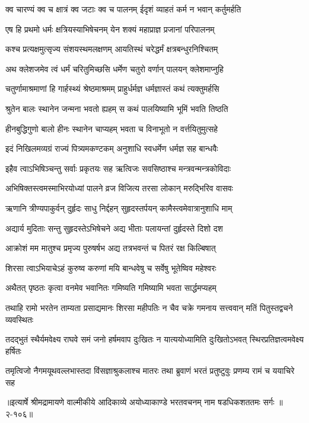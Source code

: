 \twolineshloka
{क्व चारण्यं क्व च क्षात्रं क्व जटाः क्व च पालनम्}
{ईदृशं व्याहतं कर्म न भवान् कर्तुमर्हति} %

\twolineshloka
{एष हि प्रथमो धर्मः क्षत्रियस्याभिषेचनम्}
{येन शक्यं महाप्राज्ञ प्रजानां परिपालनम्} %

\twolineshloka
{कश्च प्रत्यक्षमुत्सृज्य संशयस्थमलक्षणम्}
{आयतिस्थं चरेद्धर्मं क्षत्रबन्धुरनिश्चितम्} %

\twolineshloka
{अथ क्लेशजमेव त्वं धर्मं चरितुमिच्छसि}
{धर्मेण चतुरो वर्णान् पालयन् क्लेशमाप्नुहि} %

\twolineshloka
{चतुर्णामाश्रमाणां हि गार्हस्थ्यं श्रेष्ठमाश्रमम्}
{प्राहुर्धर्मज्ञ धर्मज्ञास्तं कथं त्यक्तुमर्हसि} %

\twolineshloka
{श्रुतेन बालः स्थानेन जन्मना भवतो ह्यहम्}
{स कथं पालयिष्यामि भूमिं भवति तिष्ठति} %

\twolineshloka
{हीनबुद्धिगुणो बालो हीनः स्थानेन चाप्यहम्}
{भवता च विनाभूतो न वर्त्तयितुमुत्सहे} %

\twolineshloka
{इदं निखिलमव्यग्रं राज्यं पित्र्यमकण्टकम्}
{अनुशाधि स्वधर्मेण धर्मज्ञ सह बान्धवैः} %

\twolineshloka
{इहैव त्वाऽभिषिञ्चन्तु सर्वाः प्रकृतयः सह}
{ऋत्विजः सवसिष्ठाश्च मन्त्रवन्मन्त्रकोविदाः} %

\twolineshloka
{अभिषिक्तस्त्वमस्माभिरयोध्यां पालने व्रज}
{विजित्य तरसा लोकान् मरुद्भिरिव वासवः} %

\twolineshloka
{ऋणानि त्रीण्यपाकुर्वन् दुर्हृदः साधु निर्द्दहन्}
{सुहृदस्तर्पयन् कामैस्त्वमेवात्रानुशाधि माम्} %

\twolineshloka
{अद्यार्य मुदिताः सन्तु सुहृदस्तेऽभिषेचने}
{अद्य भीताः पलायन्तां दुर्हृदस्ते दिशो दश} %

\twolineshloka
{आक्रोशं मम मातुश्च प्रमृज्य पुरुषर्षभ}
{अद्य तत्रभवन्तं च पितरं रक्ष किल्बिषात्} %

\twolineshloka
{शिरसा त्वाऽभियाचेऽहं कुरुष्व करुणां मयि}
{बान्धवेषु च सर्वेषु भूतेष्विव महेश्वरः} %

\twolineshloka
{अथैतत् पृष्ठतः कृत्वा वनमेव भवानितः}
{गमिष्यति गमिष्यामि भवता सार्द्धमप्यहम्} %

\twolineshloka
{तथाहि रामो भरतेन ताम्यता प्रसाद्यमानः शिरसा महीपतिः}
{न चैव चक्रे गमनाय सत्त्ववान् मतिं पितुस्तद्वचने व्यवस्थितः} %

\twolineshloka
{तदद्भुतं स्थैर्यमवेक्ष्य राघवे समं जनो हर्षमवाप दुःखितः}
{न यात्ययोध्यामिति दुःखितोऽभवत् स्थिरप्रतिज्ञत्वमवेक्ष्य हर्षितः} %

\twolineshloka
{तमृत्विजो नैगमयूथवल्लभास्तदा विंसज्ञाश्रुकलाश्च मातरः}
{तथा ब्रुवाणं भरतं प्रतुष्टुवुः प्रणम्य रामं च ययाचिरे सह} %


॥इत्यार्षे श्रीमद्रामायणे वाल्मीकीये आदिकाव्ये अयोध्याकाण्डे भरतवचनम् नाम षडधिकशततमः सर्गः ॥२-१०६॥
